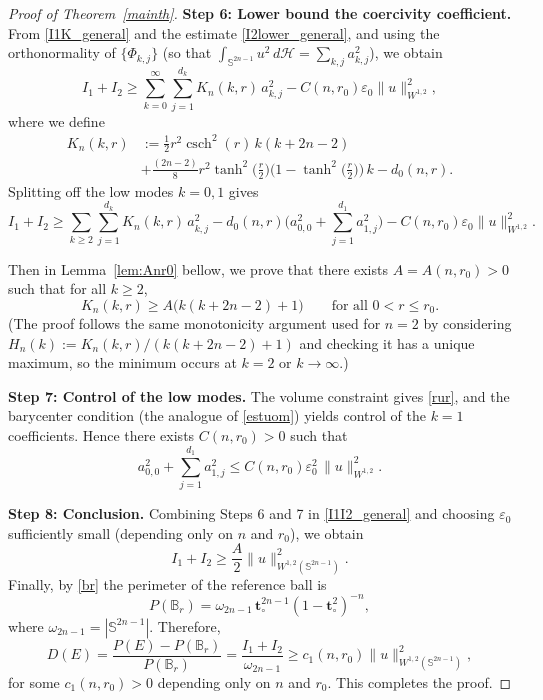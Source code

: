 \documentclass[10pt,a4paper]{amsart}
\newcommand{\csch}{\operatorname{csch}}
\def\ge{\geqslant}
\begin{document}
\begin{proof}[Proof of Theorem~\ref{mainth}]
\medskip
\noindent\textbf{Step 6: Lower bound the coercivity coefficient.}
From \eqref{I1K_general} and the estimate \eqref{I2lower_general}, and using the orthonormality of
$\{\Phi_{k,j}\}$ (so that $\int_{\mathbb S^{2n-1}}u^2\,d\mathcal H=\sum_{k,j}a_{k,j}^2$), we obtain
\[
I_1+I_2
\ge \sum_{k=0}^\infty\sum_{j=1}^{d_k} K_n(k,r)\,a_{k,j}^2
-C(n,r_0)\varepsilon_0\|u\|_{W^{1,2}}^2,
\]
where we define
\[\begin{split}
K_n(k,r)&:=
\frac12 r^2\csch^2(r)\,k(k+2n-2)
\\&+\frac{(2n-2)}{8}r^2\tanh^2\!\Big(\frac r2\Big)\Big(1-\tanh^2\!\Big(\frac r2\Big)\Big)\,k
-d_0(n,r).\end{split}
\]
Splitting off the low modes $k=0,1$ gives
\begin{equation}\label{I1I2_general}
I_1+I_2
\ge \sum_{k\ge 2}\sum_{j=1}^{d_k} K_n(k,r)\,a_{k,j}^2
-d_0(n,r)\Big(a_{0,0}^2+\sum_{j=1}^{d_1}a_{1,j}^2\Big)
-C(n,r_0)\varepsilon_0\|u\|_{W^{1,2}}^2.
\end{equation}

Then in Lemma~\ref{lem:Anr0} bellow, we prove  that there exists $A=A(n,r_0)>0$ such that for all $k\ge 2$,
\[
K_n(k,r)\ge A\big(k(k+2n-2)+1\big)
\qquad\text{for all }0<r\le r_0.
\]
(The proof follows the same monotonicity argument used for $n=2$ by considering
$H_n(k):=K_n(k,r)/(k(k+2n-2)+1)$ and checking it has a unique maximum, so the minimum
occurs at $k=2$ or $k\to\infty$.)

\medskip
\noindent\textbf{Step 7: Control of the low modes.}
The volume constraint gives \eqref{rur}, and the barycenter condition (the analogue of \eqref{estuom})
yields control of the $k=1$ coefficients. Hence there exists $C(n,r_0)>0$ such that
\[
a_{0,0}^2+\sum_{j=1}^{d_1}a_{1,j}^2
\le C(n,r_0)\varepsilon_0^2\,\|u\|_{W^{1,2}}^2.
\]

\medskip
\noindent\textbf{Step 8: Conclusion.}
Combining Steps 6 and 7 in \eqref{I1I2_general} and choosing $\varepsilon_0$ sufficiently small
(depending only on $n$ and $r_0$), we obtain
\[
I_1+I_2 \ge \frac{A}{2}\|u\|_{W^{1,2}(\mathbb S^{2n-1})}^2.
\]
Finally, by \eqref{br} the perimeter of the reference ball is
\[
P(\mathbb B_r)
=\omega_{2n-1}\,\mathbf t_\circ^{2n-1}(1-\mathbf t_\circ^2)^{-n},
\]
where $\omega_{2n-1}=|\mathbb S^{2n-1}|$. Therefore,
\[
D(E)=\frac{P(E)-P(\mathbb B_r)}{P(\mathbb B_r)}
=\frac{I_1+I_2}{\omega_{2n-1}}
\ge c_1(n,r_0)\|u\|_{W^{1,2}(\mathbb S^{2n-1})}^2,
\]
for some $c_1(n,r_0)>0$ depending only on $n$ and $r_0$.
This completes the proof.

\end{proof}
\end{document}
